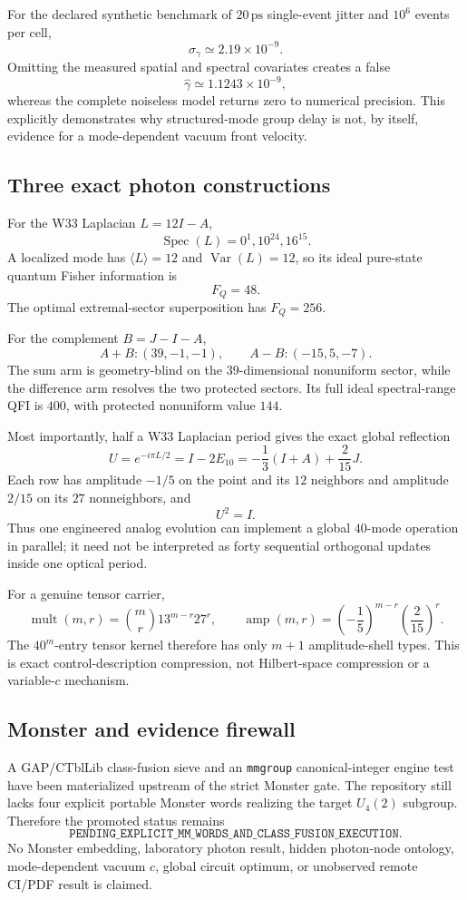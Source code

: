 For the declared synthetic benchmark of $20\,\mathrm{ps}$ single-event jitter and $10^6$ events per cell,
\[
\sigma_\gamma\simeq2.19\times10^{-9}.
\]
Omitting the measured spatial and spectral covariates creates a false
\[
\widehat\gamma\simeq1.1243\times10^{-9},
\]
whereas the complete noiseless model returns zero to numerical precision.  This explicitly demonstrates why structured-mode group delay is not, by itself, evidence for a mode-dependent vacuum front velocity.

\subsection{Three exact photon constructions}

For the W33 Laplacian $L=12I-A$,
\[
\operatorname{Spec}(L)=0^1,10^{24},16^{15}.
\]
A localized mode has $\langle L\rangle=12$ and $\operatorname{Var}(L)=12$, so its ideal pure-state quantum Fisher information is
\[
F_Q=48.
\]
The optimal extremal-sector superposition has $F_Q=256$.

For the complement $B=J-I-A$,
\[
A+B:(39,-1,-1),
\qquad
A-B:(-15,5,-7).
\]
The sum arm is geometry-blind on the $39$-dimensional nonuniform sector, while the difference arm resolves the two protected sectors.  Its full ideal spectral-range QFI is $400$, with protected nonuniform value $144$.

Most importantly, half a W33 Laplacian period gives the exact global reflection
\[
\boxed{
U=e^{-i\pi L/2}=I-2E_{10}
=-\frac13(I+A)+\frac{2}{15}J.
}
\]
Each row has amplitude $-1/5$ on the point and its $12$ neighbors and amplitude $2/15$ on its $27$ nonneighbors, and
\[
U^2=I.
\]
Thus one engineered analog evolution can implement a global $40$-mode operation in parallel; it need not be interpreted as forty sequential orthogonal updates inside one optical period.

For a genuine tensor carrier,
\[
\operatorname{mult}(m,r)=\binom mr13^{m-r}27^r,
\qquad
\operatorname{amp}(m,r)=
\left(-\frac15\right)^{m-r}
\left(\frac{2}{15}\right)^r.
\]
The $40^m$-entry tensor kernel therefore has only $m+1$ amplitude-shell types.  This is exact control-description compression, not Hilbert-space compression or a variable-$c$ mechanism.

\subsection{Monster and evidence firewall}

A GAP/CTblLib class-fusion sieve and an \texttt{mmgroup} canonical-integer engine test have been materialized upstream of the strict Monster gate.  The repository still lacks four explicit portable Monster words realizing the target $U_4(2)$ subgroup.  Therefore the promoted status remains
\[
\boxed{\texttt{PENDING\_EXPLICIT\_MM\_WORDS\_AND\_CLASS\_FUSION\_EXECUTION}.}
\]
No Monster embedding, laboratory photon result, hidden photon-node ontology, mode-dependent vacuum $c$, global circuit optimum, or unobserved remote CI/PDF result is claimed.
